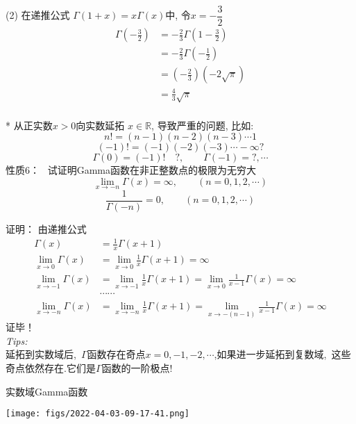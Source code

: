 	  {}
	(2) 在递推公式 $\Gamma(1+x)=x \Gamma(x)$中, 令$x=-\dfrac{3}{2}$\\
	\[
	\begin{aligned}
		 \Gamma(-\frac{3}{2})&= -\frac{2}{3} \Gamma(1-\frac{3}{2})\\
		 &=-\frac{2}{3} \Gamma(-\frac{1}{2})\\
		 &=(-\frac{2}{3})(-2 \sqrt{\pi}) \\
		 &=\frac{4}{3}\sqrt{\pi} \\
	\end{aligned}	
	\] 



	* 从正实数$x>0$向实数延拓 $x \in \mathbb{R} $, 导致严重的问题, 比如: 
	\[ n! =(n-1)(n-2)(n-3)\cdots 1\]
	\[ (-1)! =(-1)(-2)(-3)\cdots -\infty ? \] 
	\[\Gamma(0)= (-1)! \quad ? , \qquad \Gamma(-1)=?, \cdots\] 
	{\alert{性质6：}} ~试证明Gamma函数在非正整数点的极限为无穷大
	\begin{equation*}
		\lim\limits_{x\to -n }\Gamma(x)=\infty, \qquad (n=0,1,2, \cdots)
	\end{equation*}	
		\[ \frac{1}{\Gamma(-n)} =0, \qquad (n=0,1,2, \cdots) \]
	

{\alert{证明：}}  由递推公式
	\begin{equation*}
	\begin{split}
		\Gamma(x)&=\frac{1}{x} \Gamma(x+1) \\
		\lim\limits_{x\to 0 }	\Gamma(x)&=	\lim\limits_{x\to 0 } \frac{1}{x} \Gamma(x+1) =\infty \\
		\lim\limits_{x\to -1 }	\Gamma(x)&=\lim\limits_{x\to -1 } \frac{1}{x} \Gamma(x+1) =  \lim\limits_{x\to 0 } \frac{1}{x-1} \Gamma(x) =\infty \\
		& \cdots \cdots	\\	
		\lim\limits_{x\to -n }	\Gamma(x)&=\lim\limits_{x\to -n } \frac{1}{x} \Gamma(x+1) = \lim\limits_{x\to -(n-1) } \frac{1}{x-1} \Gamma(x) =\infty  
	\end{split}
	\end{equation*}	
	证毕！ \\ \vspace{1em}
{\alert{\textit{Tips:\hspace{1em}}} }\\ 
延拓到实数域后, $\Gamma$函数存在奇点$x = 0,-1,-2,\cdots$,如果进一步延拓到复数域, 这些奇点依然存在.它们是$\Gamma$函数的一阶极点!



	{实数域Gamma函数}
  \begin{center}
	   \texttt{[image: figs/2022-04-03-09-17-41.png]}
  \end{center}



